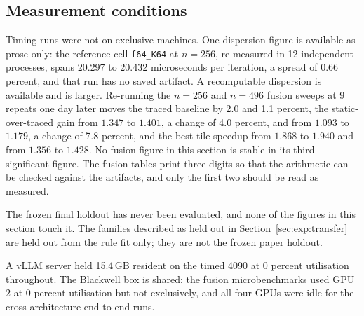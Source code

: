\subsection{Measurement conditions}
\label{sec:exp:conditions}

Timing runs were not on exclusive machines. One dispersion figure is available
as prose only: the reference cell \texttt{f64\_K64} at $n=256$, re-measured in
12 independent processes, spans 20.297 to 20.432 microseconds per iteration, a
spread of 0.66 percent, and that run has no saved artifact. A recomputable
dispersion is available and is larger. Re-running the $n=256$ and $n=496$
fusion sweeps at 9 repeats one day later moves the traced baseline by 2.0 and
1.1 percent, the static-over-traced gain from $1.347$ to $1.401$, a change of
4.0 percent, and from $1.093$ to $1.179$, a change of 7.8 percent, and the
best-tile speedup from $1.868$ to $1.940$ and from $1.356$ to $1.428$. No
fusion figure in this section is stable in its third significant figure. The
fusion tables print three digits so that the arithmetic can be checked against
the artifacts, and only the first two should be read as measured.

The frozen final holdout has never been evaluated, and none of the figures in
this section touch it. The families described as held out in
Section~\ref{sec:exp:transfer} are held out from the rule fit only; they are not
the frozen paper holdout.

A vLLM server held 15.4\,GB resident on the timed 4090 at 0 percent
utilisation throughout. The Blackwell box is shared: the fusion microbenchmarks
used GPU 2 at 0 percent utilisation but not exclusively, and all four GPUs were
idle for the cross-architecture end-to-end runs.
